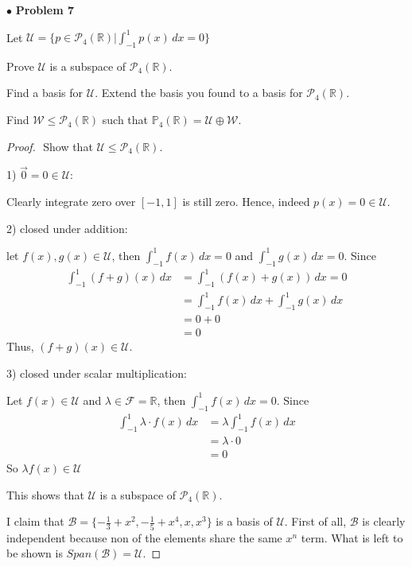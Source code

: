 \documentclass{article}
\begin{document}
\newpage
$ \bullet$ \textbf{Problem 7}
\medskip

\begin{itshape}
Let $\mathcal{U} = \{ p \in \mathcal{P}_4(\mathbb{R}) | \int_{-1}^1 p(x) \,dx = 0 \}$

Prove $\mathcal{U}$ is a subspace of $\mathcal{P}_4 (\mathbb{R})$.

Find a basis for $\mathcal{U}$. Extend the basis you found to a basis for $\mathcal{P}_4(\mathbb{R})$.

Find $\mathcal{W} \le \mathcal{P}_4(\mathbb{R})$ such that $\mathbb{P}_4(\mathbb{R}) = \mathcal{U} \oplus \mathcal{W}$.
\end{itshape}
\medskip

\begin{proof}
$ $\newline
Show that $\mathcal{U} \le \mathcal{P}_4(\mathbb{R})$.

1) $\vec{0} = 0 \in \mathcal{U}$:

Clearly integrate zero over $[-1, 1]$ is still zero. Hence, indeed $p(x) = 0 \in \mathcal{U}$.
\medskip

2) closed under addition:

let $f(x), g(x) \in \mathcal{U}$, then $\int_{-1}^1 f(x) \, dx =0$ and $\int_{-1}^1 g(x) \, dx =0$. Since
\begin{align*}
\int_{-1}^1 (f+g)(x) \, dx &= \int_{-1}^1 (f(x) + g(x)) \, dx =0 \\
&= \int_{-1}^1 f(x) \, dx + \int_{-1}^1 g(x) \, dx \\
&= 0 + 0 \\
&=0
\end{align*}
Thus, $(f+g)(x) \in \mathcal{U}$.
\medskip

3) closed under scalar multiplication:

Let $f(x) \in \mathcal{U}$ and $\lambda \in \mathcal{F} = \mathbb{R}$, then $\int_{-1}^1 f(x) \, dx =0$. Since 
\begin{align*}
\int_{-1}^1 \lambda \cdot f(x) \, dx &= \lambda \int_{-1}^1 f(x) \, dx \\
&= \lambda \cdot 0 \\
&= 0 
\end{align*}
So $\lambda f(x) \in \mathcal{U}$
\medskip

This shows that $\mathcal{U}$ is a subspace of $\mathcal{P}_4 (\mathbb{R})$.
\bigskip

I claim that $\mathcal{B} = \{ -\frac{1}{3}+x^2, -\frac{1}{5}+x^4 , x, x^3 \}$ is a basis of $\mathcal{U}$. 
First of all, $\mathcal{B}$ is clearly independent because non of the elements share the same $x^n$ term. What is left to be shown is $Span(\mathcal{B}) = \mathcal{U}$.


\end{proof}
\end{document}
